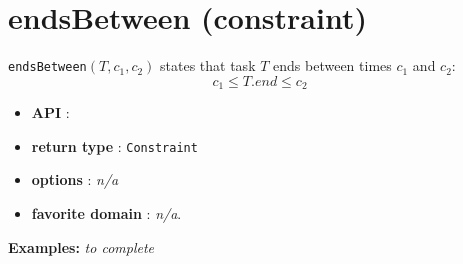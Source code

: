\section{endsBetween (constraint)}\label{endsbetween:endsbetweenconstraint}\hypertarget{endsbetween:endsbetweenconstraint}{}
\begin{notedef}
  \texttt{endsBetween}$(T, c_1, c_2)$ states that task $T$ ends between times $c_1$ and $c_2$:
  $$c_1 \le T.end \le c_2$$
\end{notedef}

\begin{itemize}
	\item \textbf{API} :
	\item \textbf{return type} : \texttt{Constraint}
	\item \textbf{options} : \emph{n/a}
	\item \textbf{favorite domain} : \emph{n/a}.
\end{itemize}

\textbf{Examples:}
%
\emph{to complete}
